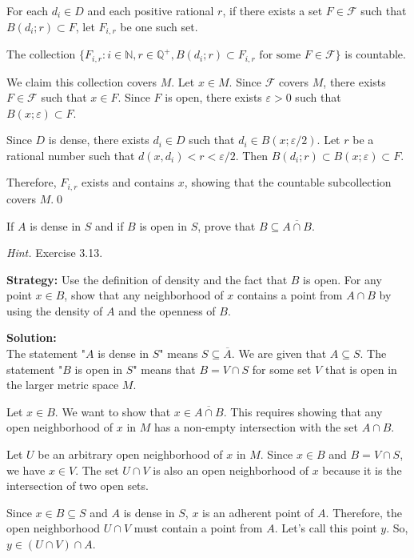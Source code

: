 For each $d_i \in D$ and each positive rational $r$, if there exists a set $F \in \mathcal{F}$ such that $B(d_i;r) \subset F$, let $F_{i,r}$ be one such set.

The collection $\{F_{i,r} : i \in \mathbb{N}, r \in \mathbb{Q}^+, B(d_i;r) \subset F_{i,r} \text{ for some } F \in \mathcal{F}\}$ is countable.

We claim this collection covers $M$. Let $x \in M$. Since $\mathcal{F}$ covers $M$, there exists $F \in \mathcal{F}$ such that $x \in F$. Since $F$ is open, there exists $\varepsilon > 0$ such that $B(x;\varepsilon) \subset F$.

Since $D$ is dense, there exists $d_i \in D$ such that $d_i \in B(x;\varepsilon/2)$. Let $r$ be a rational number such that $d(x,d_i) < r < \varepsilon/2$. Then $B(d_i;r) \subset B(x;\varepsilon) \subset F$.

Therefore, $F_{i,r}$ exists and contains $x$, showing that the countable subcollection covers $M$.\qed


\begin{problembox}
If \( A \) is dense in \( S \) and if \( B \) is open in \( S \), prove that \( B \subseteq \overline{A \cap B} \).

\textit{Hint.} Exercise 3.13.
\end{problembox}

\noindent\textbf{Strategy:} Use the definition of density and the fact that $B$ is open. For any point $x \in B$, show that any neighborhood of $x$ contains a point from $A \cap B$ by using the density of $A$ and the openness of $B$.

\bigskip\noindent\textbf{Solution:}\\
The statement "$A$ is dense in $S$" means $S \subseteq \overline{A}$. We are given that $A \subseteq S$.
The statement "$B$ is open in $S$" means that $B = V \cap S$ for some set $V$ that is open in the larger metric space $M$.

Let $x \in B$. We want to show that $x \in \overline{A \cap B}$. This requires showing that any open neighborhood of $x$ in $M$ has a non-empty intersection with the set $A \cap B$.

Let $U$ be an arbitrary open neighborhood of $x$ in $M$.
Since $x \in B$ and $B = V \cap S$, we have $x \in V$.
The set $U \cap V$ is also an open neighborhood of $x$ because it is the intersection of two open sets.

Since $x \in B \subseteq S$ and $A$ is dense in $S$, $x$ is an adherent point of $A$. Therefore, the open neighborhood $U \cap V$ must contain a point from $A$. Let's call this point $y$.
So, $y \in (U \cap V) \cap A$.

